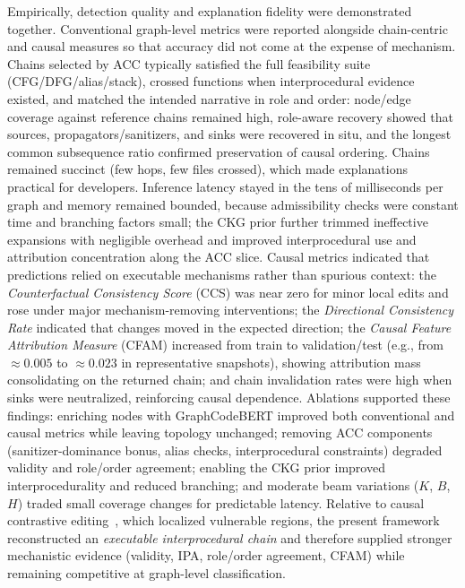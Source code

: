 \documentclass{buthesis}
\begin{document}
Empirically, detection quality and explanation fidelity were demonstrated together. Conventional graph-level metrics were reported alongside chain-centric and causal measures so that accuracy did not come at the expense of mechanism. Chains selected by ACC typically satisfied the full feasibility suite (CFG/DFG/alias/stack), crossed functions when interprocedural evidence existed, and matched the intended narrative in role and order: node/edge coverage against reference chains remained high, role-aware recovery showed that sources, propagators/sanitizers, and sinks were recovered in situ, and the longest common subsequence ratio confirmed preservation of causal ordering. Chains remained succinct (few hops, few files crossed), which made explanations practical for developers. Inference latency stayed in the tens of milliseconds per graph and memory remained bounded, because admissibility checks were constant time and branching factors small; the CKG prior further trimmed ineffective expansions with negligible overhead and improved interprocedural use and attribution concentration along the ACC slice. Causal metrics indicated that predictions relied on executable mechanisms rather than spurious context: the \emph{Counterfactual Consistency Score} (CCS) was near zero for minor local edits and rose under major mechanism-removing interventions; the \emph{Directional Consistency Rate} indicated that changes moved in the expected direction; the \emph{Causal Feature Attribution Measure} (CFAM) increased from train to validation/test (e.g., from $\approx 0.005$ to $\approx 0.023$ in representative snapshots), showing attribution mass consolidating on the returned chain; and chain invalidation rates were high when sinks were neutralized, reinforcing causal dependence. Ablations supported these findings: enriching nodes with GraphCodeBERT improved both conventional and causal metrics while leaving topology unchanged; removing ACC components (sanitizer-dominance bonus, alias checks, interprocedural constraints) degraded validity and role/order agreement; enabling the CKG prior improved interprocedurality and reduced branching; and moderate beam variations ($K$, $B$, $H$) traded small coverage changes for predictable latency. Relative to causal contrastive editing~\cite{Cao2024ICSE}, which localized vulnerable regions, the present framework reconstructed an \emph{executable interprocedural chain} and therefore supplied stronger mechanistic evidence (validity, IPA, role/order agreement, CFAM) while remaining competitive at graph-level classification.
\end{document}
